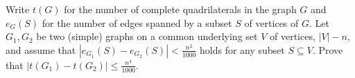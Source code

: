 Write $t(G)$ for the number of complete quadrilaterals in the graph $G$ and $e_G(S)$ for the number of edges spanned by a subset $S$ of vertices of $G$. Let $G_1, G_2$ be two (simple) graphs on a common underlying set $V$ of vertices, $|V|-n$, and assume that $|e_{G_1}(S)-e_{G_2}(S)|<\frac{n^2}{1000}$ holds for any subset $S\subseteq V$. Prove that $|t(G_1)-t(G_2)|\le \frac{n^4}{1000}$.